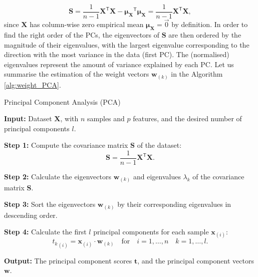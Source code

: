 \begin{equation}
\mathbf{S} =  \frac{1}{n-1} \mathbf{X}^{\mathsf{T}} \mathbf{X} -  \mathbf{\mu_X}^{\mathsf{T}}\mathbf{\mu_X}= \frac{1}{n-1} \mathbf{X}^{\mathsf{T}} \mathbf{X},
\end{equation}
since $\mathbf{X}$ has column-wise zero empirical mean $\mathbf{\mu_X}=\vec{0}$ by definition. 
In order to find the right order of the PCs, the eigenvectors of $\mathbf{S}$ are then ordered by the magnitude of their eigenvalues, with the largest eigenvalue corresponding to the direction with the most variance in the data (first PC). The (normalised) eigenvalues represent the amount of variance explained by each PC.
Let us summarise the estimation of the weight vectors $\mathbf{w}_{(k)}$ in the Algorithm \ref{alg:weight_PCA}.

\begin{algorithm}
\caption{Principal Component Analysis (PCA)}\label{alg:weight_PCA}
\begin{algorithmic}[1]
    \STATE \textbf{Input:} Dataset \(\mathbf{X}\), with \(n\) samples and \(p\) features, and the desired number of principal components \(l\).

    \STATE \textbf{Step 1:} Compute the covariance matrix \(\mathbf{S}\) of the dataset:
    \begin{equation*}
    \mathbf{S} = \frac{1}{n - 1} \mathbf{X}^{\mathsf{T}} \mathbf{X}.
    \end{equation*}

    \STATE \textbf{Step 2:} Calculate the eigenvectors \(\mathbf{w}_{(k)}\) and eigenvalues \(\lambda_k\) of the covariance matrix \(\mathbf{S}\).

    \STATE \textbf{Step 3:} Sort the eigenvectors \(\mathbf{w}_{(k)}\) by their corresponding eigenvalues in descending order.

    \STATE \textbf{Step 4:} Calculate the first \(l\) principal components for each sample \(\mathbf{x}_{(i)}\):
    \begin{equation*}
    {t_{k}}_{(i)} = \mathbf{x}_{(i)} \cdot \mathbf{w}_{(k)} \quad \text{for} \quad i = 1, \ldots, n \quad k = 1, \ldots, l.
    \end{equation*}
    
    \STATE \textbf{Output:} The principal component scores \(\mathbf{t}\), and the principal component vectors \(\mathbf{w}\).
\end{algorithmic}
\end{algorithm}


